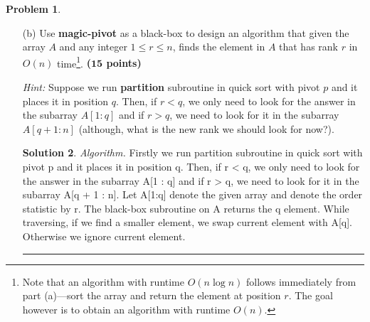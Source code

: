 \documentclass{article}
\theoremstyle{definition}
\newtheorem{problem}{Problem}
\def\fline{\rule{0.75\linewidth}{0.5pt}}
\newcommand{\finishline}{\begin{center}\fline\end{center}}
\newtheorem*{solution*}{Solution}
\newenvironment{solution}{\begin{solution*}}{{\finishline} \end{solution*}}
\newcommand{\grade}[1]{\hfill{\textbf{($\mathbf{#1}$ points)}}}
\begin{document}
\begin{problem}
\begin{enumerate}
\begin{solution}
		\emph{Runtime Analysis.}  As from the above algorithm the array is partitioned in such three parts. Thus, it is possible that in worst case, array is partitioned in three parts such that one part is smaller than m/3, one part is greater and equal to m/3 and smaller and equal to 2m/3, and other part is greater than 2m/3, makes its time complexity will be O(log N). Whereas there is a loop in the above algorithm. So, complexity is O(n). Therefore, the total runtime is $O(n\log{n})$. \\
	
	\end{solution}
	
	\item[(b)] Use \textbf{magic-pivot} as a black-box to design an algorithm that given the array $A$ and any integer $1 \leq r \leq n$, finds the element in $A$ that has rank $r$ in $O(n)$ time\footnote{Note that an algorithm with runtime $O(n\log{n})$ follows immediately from part (a)---sort the array and return the element at position $r$. The goal however is to obtain an algorithm with runtime $O(n)$.}. \grade{15}
	
	\emph{Hint:} Suppose we run \textbf{partition} subroutine in quick sort with pivot $p$ and it places it in position $q$. Then, if $r < q$, we only need to look for the answer in the subarray $A[1:q]$ and 
	if $r > q$, we need to look for it in the subarray $A[q+1:n]$ (although, what is the new rank we should look for now?). 


	\begin{solution}
		
		\emph{Algorithm.} Firstly we run partition subroutine in quick sort with pivot p and it places it in position q. Then, if r < q, we only need to look for the answer in the subarray A[1 : q] and if r > q, we need to look for it in the subarray A[q + 1 : n]. Let A[1:q] denote the given array and denote the order statistic by r. The black-box subroutine on A returns the q element. While traversing, if we find a smaller element, we swap current element with A[q]. Otherwise we ignore current element.  \\
		

\end{solution}
\end{enumerate}
\end{problem}
\end{document}
